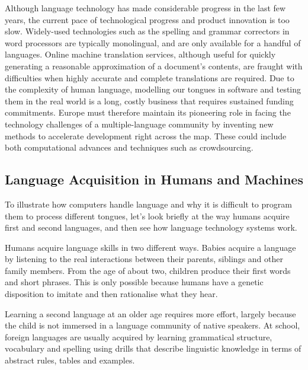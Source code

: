 \documentclass[]{../../metanetpaper}
\begin{document}
\begin{multicols}{2}
Although language technology has made considerable progress in the last few
years, the current pace of technological progress and product innovation is
too slow. Widely-used technologies such as the spelling and grammar correctors
in word processors are typically monolingual, and are only available for a
handful of languages. Online machine translation services, although useful for
quickly generating a reasonable approximation of a document's contents, are
fraught with difficulties when highly accurate and complete translations are
required. Due to the complexity of human language, modelling our tongues in
software and testing them in the real world is a long, costly business that
requires sustained funding commitments. Europe must therefore maintain its
pioneering role in facing the technology challenges of a multiple-language
community by inventing new methods to accelerate development right across the
map. These could include both computational advances and techniques such as
crowdsourcing.



\subsection{Language Acquisition in Humans and Machines}

To illustrate how computers handle language and why it is difficult to program
them to process different tongues, let’s look briefly at the way humans
acquire first and second languages, and then see how language technology
systems work.

Humans acquire language skills in two different ways. Babies acquire a
language by listening to the real interactions between their parents, siblings
and other family members. From the age of about two, children produce their
first words and short phrases. This is only possible because humans have a
genetic disposition to imitate and then rationalise what they hear. 


Learning a second language at an older age requires more effort, largely
because the child is not immersed in a language community of native
speakers. At school, foreign languages are usually acquired by learning
grammatical structure, vocabulary and spelling using drills that describe
linguistic knowledge in terms of abstract rules, tables and examples.



\end{multicols}
\end{document}
